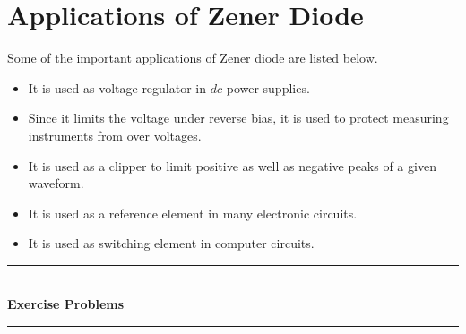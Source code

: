 \section{Applications of Zener Diode}
Some of the important applications of Zener diode are listed below.
\begin{itemize}
\item It is used as voltage regulator in $dc$ power supplies.

\item Since it limits the voltage under reverse bias, it is used to protect measuring instruments from over voltages.

\eject

\item It is used as a clipper to limit positive as well as negative peaks of a given waveform.

\item It is used as a reference element in many electronic circuits.

\item It is used as switching element in computer circuits.
\end{itemize}

\bigskip
\begin{center}
\rule{5cm}{1pt}\\[-2pt]
{\bf Exercise Problems}\\[-4pt]
\rule{5cm}{1pt}
\end{center}
\smallskip

